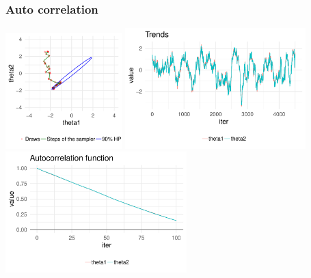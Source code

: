 \documentclass[10pt,handout]{beamer}
\begin{document}
\begin{frame}

\frametitle{Auto correlation}

  \vspace{-0.5\baselineskip}
  \includegraphics[width=4.5cm]{figs/Metrop2.pdf}
  {\includegraphics[width=7cm]{figs/Metrop2trace.pdf}\\}
  {\includegraphics[width=7cm]{figs/Metrop2acf.pdf}}

\end{frame}
\end{document}
